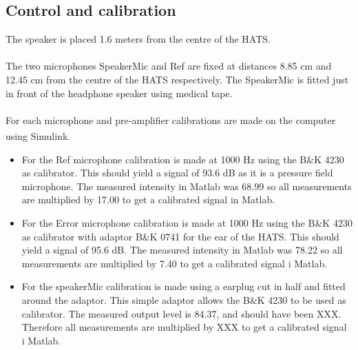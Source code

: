 \subsection{Control and calibration}
The speaker is placed 1.6 meters from the centre of the HATS. \\\\
The two microphones SpeakerMic and Ref are fixed at distances 8.85 cm and 12.45 cm from the centre of the HATS respectively. The SpeakerMic is fitted just in front of the headphone speaker using medical tape.\\\\
For each microphone and pre-amplifier calibrations are made on the computer using Simulink\textsuperscript{\textregistered}.
\begin{itemize}
	\item For the Ref microphone calibration is made at 1000 Hz using the B\&K 4230 as calibrator. This should yield a signal of 93.6 dB as it is a pressure field microphone. The measured intensity in Matlab was 68.99 so all measurements are multiplied by 17.00 to get a calibrated signal in Matlab. 
	\item For the Error microphone calibration is made at 1000 Hz using the B\&K 4230 as calibrator with adaptor B\&K 0741 for the ear of the HATS. This should yield a signal of 95.6 dB. The measured intensity in Matlab was 78.22 so all measurements are multiplied by 7.40 to get a calibrated signal i Matlab. 
	\item For the speakerMic calibration is made using a earplug cut in half and fitted around the adaptor. This simple adaptor allows the B\&K 4230 to be used as calibrator. The measured output level is 84.37, and should have been XXX. Therefore all measurements are multiplied by XXX to get a calibrated signal i Matlab. 
\end{itemize}
 
